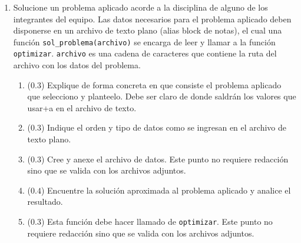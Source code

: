 \documentclass[12pt]{article}
\begin{document}
\begin{enumerate}[leftmargin=*,widest=9]
\begin{enumerate}[label=\alph*]
   \end{enumerate}
\item Solucione un problema aplicado acorde a la disciplina de alguno de los integrantes del equipo. Las datos necesarios para el problema aplicado deben disponerse en un archivo de texto plano (alias block de notas), el cual una función \verb-sol_problema(archivo)- se encarga de leer y llamar a la función \verb-optimizar-. \verb-archivo- es una cadena de caracteres que contiene la ruta del archivo con los datos del problema.
    \begin{enumerate}[label=\alph*]
    \item ($0.3$) Explique de forma concreta en que consiste el problema aplicado que selecciono y planteelo. Debe ser claro de donde saldrán los valores que usar+a en el archivo de texto.
    \item ($0.3$) Indique el orden y tipo de datos como se ingresan en el archivo de texto plano.
    \item ($0.3$) Cree y anexe el archivo de datos. Este punto no requiere redacción sino que se valida con los archivos adjuntos.
    \item ($0.4$) Encuentre la solución aproximada al problema aplicado y analice el resultado.
    \item ($0.3$) Esta función debe hacer llamado de \verb-optimizar-. Este punto no requiere redacción sino que se valida con los archivos adjuntos.
   \end{enumerate}
\end{enumerate}
\end{document}
